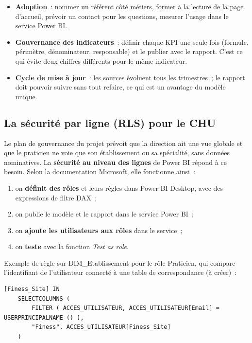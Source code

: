 \begin{itemize}
	\item \textbf{Adoption}~: nommer un référent côté métiers, former à la lecture de la page d'accueil, prévoir un contact pour les questions, mesurer l'usage dans le service Power BI.
	\item \textbf{Gouvernance des indicateurs}~: définir chaque KPI une seule fois (formule, périmètre, dénominateur, responsable) et le publier avec le rapport. C'est ce qui évite deux chiffres différents pour le même indicateur.
	\item \textbf{Cycle de mise à jour}~: les sources évoluent tous les trimestres~; le rapport doit pouvoir suivre sans tout refaire, ce qui est un avantage du modèle unique.
\end{itemize}

\subsection{La sécurité par ligne (RLS) pour le CHU}

\noindent Le plan de gouvernance du projet prévoit que la direction ait une vue globale et que le praticien ne voie que son établissement ou sa spécialité, sans données nominatives. La \textbf{sécurité au niveau des lignes} de Power BI répond à ce besoin. Selon la documentation Microsoft, elle fonctionne ainsi~:
\begin{enumerate}
	\item on \textbf{définit des rôles} et leurs règles dans Power BI Desktop, avec des expressions de filtre DAX~;
	\item on publie le modèle et le rapport dans le service Power BI~;
	\item on \textbf{ajoute les utilisateurs aux rôles} dans le service~;
	\item on \textbf{teste} avec la fonction \textit{Test as role}.
\end{enumerate}

\noindent Exemple de règle sur DIM\_Etablissement pour le rôle \og Praticien\fg{}, qui compare l'identifiant de l'utilisateur connecté à une table de correspondance (à créer)~:

\begin{center}
\begin{minipage}{0.92\textwidth}
\begin{tcolorbox}[colback=title2!6,colframe=title1,boxsep=2pt]
\begin{verbatim}
[Finess_Site] IN
    SELECTCOLUMNS (
        FILTER ( ACCES_UTILISATEUR, ACCES_UTILISATEUR[Email] = USERPRINCIPALNAME () ),
        "Finess", ACCES_UTILISATEUR[Finess_Site]
    )
\end{verbatim}
\end{tcolorbox}
\end{minipage}
\end{center}

